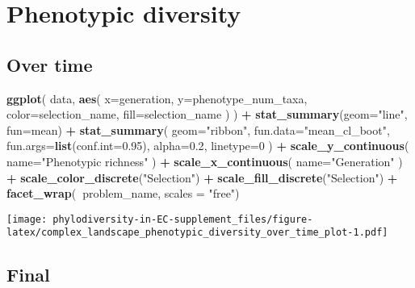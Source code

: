 \documentclass[]{book}
\newenvironment{Shaded}{\begin{snugshade}}{\end{snugshade}}
\newcommand{\DataTypeTok}[1]{\textcolor[rgb]{0.13,0.29,0.53}{#1}}
\newcommand{\DecValTok}[1]{\textcolor[rgb]{0.00,0.00,0.81}{#1}}
\newcommand{\FloatTok}[1]{\textcolor[rgb]{0.00,0.00,0.81}{#1}}
\newcommand{\KeywordTok}[1]{\textcolor[rgb]{0.13,0.29,0.53}{\textbf{#1}}}
\newcommand{\NormalTok}[1]{#1}
\newcommand{\OperatorTok}[1]{\textcolor[rgb]{0.81,0.36,0.00}{\textbf{#1}}}
\newcommand{\StringTok}[1]{\textcolor[rgb]{0.31,0.60,0.02}{#1}}
\begin{document}
\hypertarget{phenotypic-diversity-1}{%
\section{Phenotypic diversity}\label{phenotypic-diversity-1}}

\hypertarget{over-time-5}{%
\subsection{Over time}\label{over-time-5}}

\begin{Shaded}
\begin{Highlighting}[]
\KeywordTok{ggplot}\NormalTok{(}
\NormalTok{    data,}
    \KeywordTok{aes}\NormalTok{(}
      \DataTypeTok{x=}\NormalTok{generation,}
      \DataTypeTok{y=}\NormalTok{phenotype_num_taxa,}
      \DataTypeTok{color=}\NormalTok{selection_name,}
      \DataTypeTok{fill=}\NormalTok{selection_name}
\NormalTok{    )}
\NormalTok{  ) }\OperatorTok{+}
\StringTok{  }\KeywordTok{stat_summary}\NormalTok{(}\DataTypeTok{geom=}\StringTok{"line"}\NormalTok{, }\DataTypeTok{fun=}\NormalTok{mean) }\OperatorTok{+}
\StringTok{  }\KeywordTok{stat_summary}\NormalTok{(}
    \DataTypeTok{geom=}\StringTok{"ribbon"}\NormalTok{,}
    \DataTypeTok{fun.data=}\StringTok{"mean_cl_boot"}\NormalTok{,}
    \DataTypeTok{fun.args=}\KeywordTok{list}\NormalTok{(}\DataTypeTok{conf.int=}\FloatTok{0.95}\NormalTok{),}
    \DataTypeTok{alpha=}\FloatTok{0.2}\NormalTok{,}
    \DataTypeTok{linetype=}\DecValTok{0}
\NormalTok{  ) }\OperatorTok{+}
\StringTok{  }\KeywordTok{scale_y_continuous}\NormalTok{(}
    \DataTypeTok{name=}\StringTok{"Phenotypic richness"}
\NormalTok{  ) }\OperatorTok{+}
\StringTok{  }\KeywordTok{scale_x_continuous}\NormalTok{(}
    \DataTypeTok{name=}\StringTok{"Generation"}
\NormalTok{  ) }\OperatorTok{+}
\StringTok{  }\KeywordTok{scale_color_discrete}\NormalTok{(}\StringTok{"Selection"}\NormalTok{) }\OperatorTok{+}\StringTok{ }
\StringTok{  }\KeywordTok{scale_fill_discrete}\NormalTok{(}\StringTok{"Selection"}\NormalTok{) }\OperatorTok{+}
\StringTok{  }\KeywordTok{facet_wrap}\NormalTok{(}\OperatorTok{~}\NormalTok{problem_name, }\DataTypeTok{scales =} \StringTok{"free"}\NormalTok{)}
\end{Highlighting}
\end{Shaded}

\texttt{[image: phylodiversity-in-EC-supplement\_files/figure-latex/complex\_landscape\_phenotypic\_diversity\_over\_time\_plot-1.pdf]}

\hypertarget{final-5}{%
\subsection{Final}\label{final-5}}
\end{document}
